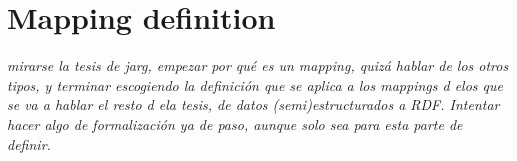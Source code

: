 \section{Mapping definition}
\label{sec:chp4_mapping_def}

\textit{mirarse la tesis de jarg, empezar por qué es un mapping, quizá hablar de los otros tipos, y terminar escogiendo la definición que se aplica a los mappings d elos que se va a hablar el resto d ela tesis, de datos (semi)estructurados a RDF. Intentar hacer algo de formalización ya de paso, aunque solo sea para esta parte de definir. }